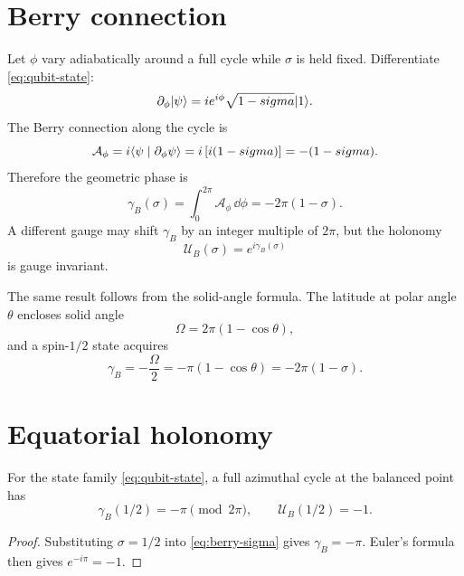 \section{Berry connection}
Let $\phi$ vary adiabatically around a full cycle while $\sigma$ is held fixed. Differentiate \eqref{eq:qubit-state}:
\begin{equation}
\partial_\phi\lvert \psi\rangle
=i e^{i\phi}\sqrt{1-sigma}\lvert 1\rangle.
\end{equation}
The Berry connection along the cycle is
\begin{equation}
\mathcal A_\phi
=i\langle \psi\mid \partial_\phi\psi\rangle
=i\left[i(1-sigma)\right]
=-(1-sigma).
\end{equation}
Therefore the geometric phase is
\begin{equation}
\gamma_B(\sigma)
=\int_0^{2\pi}\mathcal A_\phi\,\dd\phi
=-2\pi(1-\sigma).
\label{eq:berry-sigma}
\end{equation}
A different gauge may shift $\gamma_B$ by an integer multiple of $2\pi$, but the holonomy
\begin{equation}
\mathcal U_B(\sigma)=e^{i\gamma_B(\sigma)}
\end{equation}
is gauge invariant.

The same result follows from the solid-angle formula. The latitude at polar angle $\theta$ encloses solid angle
\begin{equation}
\Omega=2\pi(1-\cos\theta),
\end{equation}
and a spin-$1/2$ state acquires
\begin{equation}
\gamma_B=-\frac{\Omega}{2}
=-\pi(1-\cos\theta)
=-2\pi(1-\sigma).
\end{equation}

\section{Equatorial holonomy}
\begin{theorem}
For the state family \eqref{eq:qubit-state}, a full azimuthal cycle at the balanced point has
\begin{equation}
\gamma_B(1/2)=-\pi\pmod{2\pi},
\qquad
\mathcal U_B(1/2)=-1.
\end{equation}
\end{theorem}

\begin{proof}
Substituting $\sigma=1/2$ into \eqref{eq:berry-sigma} gives $\gamma_B=-\pi$. Euler's formula then gives $e^{-i\pi}=-1$.
\end{proof}

